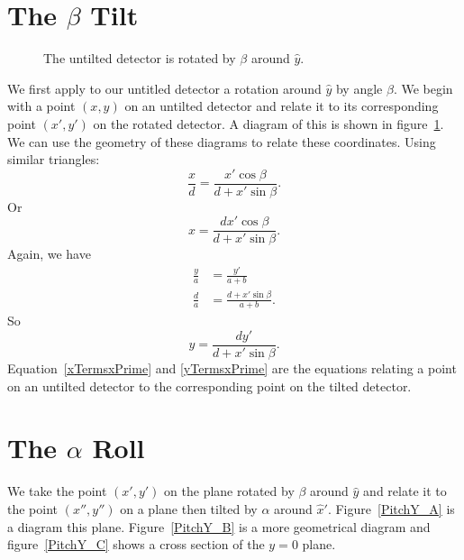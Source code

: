 \section{\texorpdfstring{The $\beta$ Tilt}{The beta Tilt}}

\begin{figure}[htb]
    \centering
    \subfloat[]{\label{PitchX_A}} 
    \hfill
    \subfloat[]{
    \label{PitchX_B}}
    \caption{The untilted detector is rotated by $\beta$ around
    $\hat y$.}
    \label{PitchX}
\end{figure}

We first apply to our untitled detector a rotation 
around $\hat{y}$ by angle $\beta$.
We begin with a point $(x,y)$ on an
untilted detector and relate it to its corresponding point 
$(x',y')$ on the rotated detector.
A diagram of this is shown in figure~\ref{PitchX}.  
We can use the geometry of these diagrams 
to relate these coordinates. Using
similar triangles:
\begin{equation}
    \frac{x}{d}=\frac{x'\cos\beta}{d+x'\sin\beta}.
\end{equation}
Or
\begin{equation}\label{xTermsxPrime}
    \boxed{x = \frac{dx'\cos\beta}{d+x'\sin\beta}}.
\end{equation}
Again, we have
\begin{align}
    \frac{y}{a}&=\frac{y'}{a+b}\\
    \frac{d}{a}&=\frac{d+x'\sin\beta}{a+b}.
\end{align}
So
\begin{equation}\label{yTermsxPrime}
	\boxed{y= \frac{dy'}{d+x'\sin\beta}}.
\end{equation}
Equation~\ref{xTermsxPrime} and \ref{yTermsxPrime} are 
the equations relating a point on an
untilted detector to the corresponding point 
on the tilted detector.

\section{\texorpdfstring{The $\alpha$ Roll}{The alpha Roll}}

We take the point $(x',y')$ on the plane rotated by $\beta$
around $\hat y$ and relate it to the point $(x'',y'')$ on a
plane then tilted by $\alpha$ around $\hat{x}'$. 
Figure~\ref{PitchY_A} is a diagram this plane.
Figure~\ref{PitchY_B} is a more geometrical diagram and
figure~\ref{PitchY_C} shows a cross section of the $y=0$
plane.

